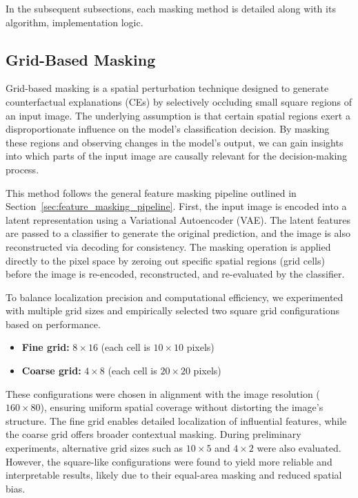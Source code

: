 In the subsequent subsections, each masking method is detailed along with its algorithm, implementation logic.
 

\subsection{Grid-Based Masking} \label{sec:grid_based_masking}

Grid-based masking is a spatial perturbation technique designed to generate counterfactual explanations (CEs) by selectively occluding small square regions of an input image. The underlying assumption is that certain spatial regions exert a disproportionate influence on the model’s classification decision. By masking these regions and observing changes in the model’s output, we can gain insights into which parts of the input image are causally relevant for the decision-making process.

This method follows the general feature masking pipeline outlined in Section~\ref{sec:feature_masking_pipeline}. First, the input image is encoded into a latent representation using a Variational Autoencoder (VAE). The latent features are passed to a classifier to generate the original prediction, and the image is also reconstructed via decoding for consistency. The masking operation is applied directly to the pixel space by zeroing out specific spatial regions (grid cells) before the image is re-encoded, reconstructed, and re-evaluated by the classifier.

To balance localization precision and computational efficiency, we experimented with multiple grid sizes and empirically selected two square grid configurations based on performance. 

\begin{itemize}
    \item \textbf{Fine grid:} $8 \times 16$ (each cell is $10 \times 10$ pixels)
    \item \textbf{Coarse grid:} $4 \times 8$ (each cell is $20 \times 20$ pixels)
\end{itemize}

These configurations were chosen in alignment with the image resolution ($160 \times 80$), ensuring uniform spatial coverage without distorting the image’s structure. The fine grid enables detailed localization of influential features, while the coarse grid offers broader contextual masking. During preliminary experiments, alternative grid sizes such as $10 \times 5$ and $4 \times 2$ were also evaluated. However, the square-like configurations were found to yield more reliable and interpretable results, likely due to their equal-area masking and reduced spatial bias.

